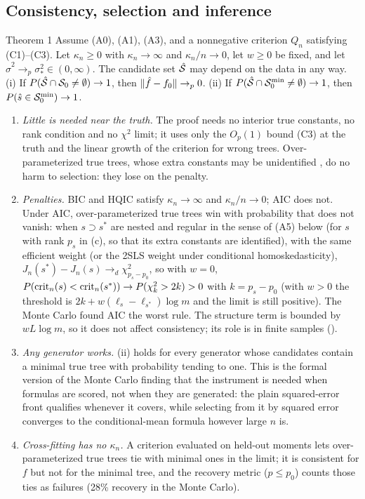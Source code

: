 \subsection{Consistency, selection and inference}

\begin{result}[Theorem1]{Theorem 1}
Assume (A0), (A1), (A3), and a nonnegative criterion $Q_n$ satisfying (C1)--(C3). Let $\kappa_n \ge 0$ with $\kappa_n \to \infty$ and $\kappa_n/n \to 0$, let $w \ge 0$ be fixed, and let $\hat\sigma^2 \to_p \sigma_*^2 \in (0, \infty)$. The candidate set $\hat{\mathcal{S}}$ may depend on the data in any way.
(i) If $P(\hat{\mathcal{S}} \cap \mathcal{S}_0 \ne \emptyset) \to 1$, then $\lVert \hat f - f_0\rVert \to_p 0$.
(ii) If $P(\hat{\mathcal{S}} \cap \mathcal{S}_0^{\min} \ne \emptyset) \to 1$, then $P(\hat s \in \mathcal{S}_0^{\min}) \to 1$.
\end{result}

\begin{remarks}
\begin{enumerate}
\item \emph{Little is needed near the truth.} The proof needs no interior true constants, no rank condition and no $\chi^2$ limit; it uses only the $O_p(1)$ bound (C3) at the truth and the linear growth of the criterion for wrong trees. Over-parameterized true trees, whose extra constants may be unidentified \citep{andrewscheng2012}, do no harm to selection: they lose on the penalty.
\item \emph{Penalties.} BIC and HQIC satisfy $\kappa_n \to \infty$ and $\kappa_n/n \to 0$; AIC does not. Under AIC, over-parameterized true trees win with probability that does not vanish: when $s \supset s^*$ are nested and regular in the sense of (A5) below (for $s$ with rank $p_s$ in (c), so that its extra constants are identified), with the same efficient weight (or the 2SLS weight under conditional homoskedasticity), $J_n(s^*) - J_n(s) \to_d \chi^2_{p_s - p_0}$, so with $w = 0$, $P(\mathrm{crit}_n(s) < \mathrm{crit}_n(s^*)) \to P(\chi^2_k > 2k) > 0$ with $k = p_s - p_0$ (with $w > 0$ the threshold is $2k + w(\ell_s - \ell_{s^*})\log m$ and the limit is still positive). The Monte Carlo found AIC the worst rule. The structure term is bounded by $wL\log m$, so it does not affect consistency; its role is in finite samples ().
\item \emph{Any generator works.} (ii) holds for every generator whose candidates contain a minimal true tree with probability tending to one. This is the formal version of the Monte Carlo finding that the instrument is needed when formulas are scored, not when they are generated: the plain squared-error front qualifies whenever it covers, while selecting from it by squared error converges to the conditional-mean formula however large $n$ is.
\item \emph{Cross-fitting has no $\kappa_n$.} A criterion evaluated on held-out moments lets over-parameterized true trees tie with minimal ones in the limit; it is consistent for $f$ but not for the minimal tree, and the recovery metric ($p \le p_0$) counts those ties as failures (28\% recovery in the Monte Carlo).
\end{enumerate}
\end{remarks}

